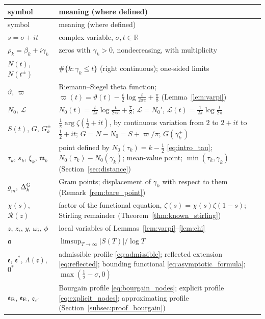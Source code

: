 \documentclass[11pt,a4paper]{article}
\makeatletter
\numberwithin{equation}{section}
\DeclareRobustCommand{\CGref}[1]{\ref{#1}}
\DeclareRobustCommand{\CGeqref}[1]{\eqref{#1}}
\let\CG@origref\ref
\let\CG@origeqref\eqref
\newcommand{\CG@gettip}[1]{\@ifundefined{CGTip@#1}{#1}{\csname CGTip@#1\endcsname}}
\DeclareRobustCommand{\CGref}[1]{\pdftooltip{\CG@origref{#1}}{\CG@gettip{#1}}}
\DeclareRobustCommand{\CGeqref}[1]{\pdftooltip{\CG@origeqref{#1}}{\CG@gettip{#1}}}
\theoremstyle{definition}
\theoremstyle{remark}
\newcommand{\Nz}{N_0} %
\newcommand{\lL}{\mathcal L}
\newcommand{\eB}{\mathfrak e_{\rm B}}
\newcommand{\eE}{\mathfrak e_{\rm E}}
\newcommand{\R}{\mathbb R}
\makeatother
\begin{document}
\begin{center}\small
\begin{longtable}{p{}p{}}
\toprule symbol & meaning (where defined)\\\midrule\endfirsthead
\toprule symbol & meaning (where defined)\\\midrule\endhead
\bottomrule\endfoot
$s=\sigma+it$ & complex variable, $\sigma,t\in\R$\\
$\rho_k=\beta_k+i\gamma_k$ & zeros with $\gamma_k>0$, nondecreasing, with multiplicity\\
$N(t)$, $N(t^\pm)$ & $\#\{k:\gamma_k\le t\}$ (right continuous); one-sided limits\\
$\vartheta$, $\varpi$ & Riemann--Siegel theta function; $\varpi(t)=\vartheta(t)-\frac t2\log\frac t{2\pi e}+\frac\pi8$ (Lemma~\CGref{lem:varpi})\\
$\Nz$, $\lL$ & $\Nz(t)=\frac t{2\pi}\log\frac t{2\pi e}+\frac78$; $\lL=\Nz'$, $\lL(t)=\frac1{2\pi}\log\frac t{2\pi}$\\
$S(t)$, $G$, $G_k^\pm$ & $\frac1\pi\arg\zeta(\frac12+it)$, by continuous variation from $2$ to $2+it$ to $\frac12+it$; $G=N-\Nz=S+\varpi/\pi$; $G(\gamma_k^\pm)$\\
$\tau_k$, $s_k$, $\xi_k$, $\mathfrak m_k$ & point defined by $\Nz(\tau_k)=k-\frac12$ \CGeqref{eq:intro_tau}; $\Nz(\tau_k)-\Nz(\gamma_k)$; mean-value point; $\min(\tau_k,\gamma_k)$ (Section~\CGref{sec:distance})\\
$g_m$, $\Delta^{\rm G}_k$ & Gram points; displacement of $\gamma_k$ with respect to them (Remark~\CGref{rem:bare_point})\\
$\chi(s)$, $\mathcal R(z)$ & factor of the functional equation, $\zeta(s)=\chi(s)\zeta(1-s)$; Stirling remainder (Theorem~\CGref{thm:known_stirling})\\
$z$, $z_i$, $y$, $\omega_i$, $\phi$ & local variables of Lemmas~\CGref{lem:varpi}--\CGref{lem:chi}\\
$\mathfrak a$ & $\limsup_{T\to\infty}|S(T)|/\log T$\\
$\mathfrak e$, $\mathfrak e^*$, $\Lambda(\mathfrak e)$, $0^*$ & admissible profile \CGeqref{eq:admissible}; reflected extension \CGeqref{eq:reflected}; bounding functional \CGeqref{eq:asymptotic_formula}; $\max(\frac12-\sigma,0)$\\
$\eB$, $\eE$, $\mathfrak e_{\varepsilon'}$ & Bourgain profile \CGeqref{eq:bourgain_nodes}; explicit profile \CGeqref{eq:explicit_nodes}; approximating profile (Section~\CGref{subsec:proof_bourgain})\\

\end{longtable}
\end{center}
\end{document}
